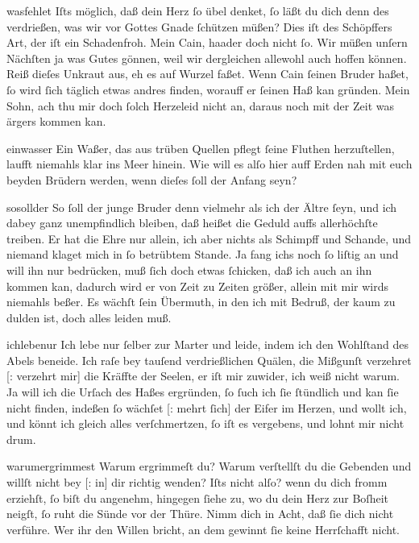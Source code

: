 \documentclass[tocstyle=ref-genre]{ees}
\begin{document}
{\begin{movement}{wasfehlet}
  \voice[Eva]
  Iſts möglich, daß dein Herz ſo übel denket,
  ſo läßt du dich denn des verdrießen,
  was wir vor Gottes Gnade ſchützen müßen?
  Dies iſt des Schöpffers Art, der iſt ein Schadenfroh.
  Mein Cain, haader doch nicht ſo.
  Wir müßen unſern Nächſten ja was Gutes gönnen,
  weil wir dergleichen allewohl auch hoffen können.
  Reiß dieſes Unkraut aus, eh es auf Wurzel faßet.
  Wenn Cain ſeinen Bruder haßet,
  ſo wird ſich täglich etwas andres finden,
  worauff er ſeinen Haß kan gründen.
  Mein Sohn, ach thu mir doch ſolch Herzeleid nicht an,
  daraus noch mit der Zeit was ärgers kommen kan.
\end{movement}

\begin{movement}{einwasser}
  \voice[Eva]
  Ein Waßer, das aus trüben Quellen
  pflegt ſeine Fluthen herzuſtellen,
  laufft niemahls klar ins Meer hinein.
  Wie will es alſo hier auff Erden
  nah mit euch beyden Brüdern werden,
  wenn dieſes ſoll der Anfang seyn?
\end{movement}

\begin{movement}{sosollder}
  \voice[Cain]
  So ſoll der junge Bruder denn
  vielmehr als ich der Ältre ſeyn,
  und ich dabey ganz unempfindlich bleiben,
  daß heißet die Geduld auffs allerhöchſte treiben.
  Er hat die Ehre nur allein,
  ich aber nichts als Schimpff und Schande,
  und niemand klaget mich in ſo betrübtem Stande.
  Ja fang ichs noch ſo liſtig an
  und will ihn nur bedrücken,
  muß ſich doch etwas ſchicken,
  daß ich auch an ihn kommen kan,
  dadurch wird er von Zeit zu Zeiten größer,
  allein mit mir wirds niemahls beßer.
  Es wächſt ſein Übermuth, in den ich mit Bedruß,
  der kaum zu dulden ist, doch alles leiden muß.
\end{movement}

\begin{movement}{ichlebenur}
  \voice[Cain]
  Ich lebe nur ſelber zur Marter und leide,
  indem ich den Wohlſtand des Abels beneide.
  Ich raſe bey tauſend verdrießlichen Quälen,
  die Mißgunſt verzehret [: verzehrt mir] die Kräffte der Seelen,
  er iſt mir zuwider, ich weiß nicht warum.
  Ja will ich die Urſach des Haßes ergründen,
  ſo ſuch ich ſie ſtündlich und kan ſie nicht finden,
  indeßen ſo wächſet [: mehrt ſich] der Eifer im Herzen,
  und wollt ich, und könnt ich gleich alles verſchmertzen,
  ſo iſt es vergebens, und lohnt mir nicht drum.
\end{movement}

\begin{movement}{warumergrimmest}
  Warum ergrimmeſt du?
  Warum verſtellſt du die Gebenden
  und willſt nicht bey [: in] dir richtig wenden?
  Iſts nicht alſo? wenn du dich fromm erziehſt,
  ſo biſt du angenehm, hingegen ſiehe zu,
  wo du dein Herz zur Boſheit neigſt,
  ſo ruht die Sünde vor der Thüre.
  Nimm dich in Acht, daß ſie dich nicht verführe.
  Wer ihr den Willen bricht,
  an dem gewinnt ſie keine Herrſchafft nicht.


\end{movement}}
\end{document}
